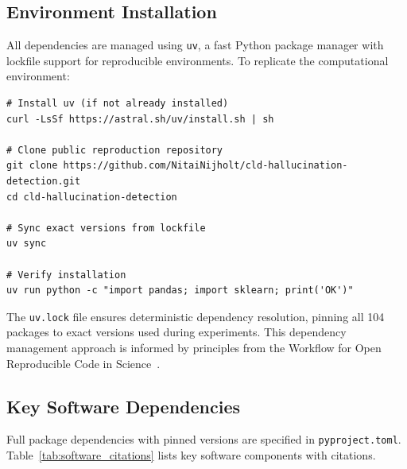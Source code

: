 \subsection{Environment Installation}

All dependencies are managed using \texttt{uv}, a fast Python package manager with lockfile support for reproducible environments. To replicate the computational environment:

\begin{verbatim}
# Install uv (if not already installed)
curl -LsSf https://astral.sh/uv/install.sh | sh

# Clone public reproduction repository
git clone https://github.com/NitaiNijholt/cld-hallucination-detection.git
cd cld-hallucination-detection

# Sync exact versions from lockfile
uv sync

# Verify installation
uv run python -c "import pandas; import sklearn; print('OK')"
\end{verbatim}

\noindent The \texttt{uv.lock} file ensures deterministic dependency resolution, pinning all 104 packages to exact versions used during experiments. This dependency management approach is informed by principles from the Workflow for Open Reproducible Code in Science~\cite{vanlissa2021worcs}.

\subsection{Key Software Dependencies}

Full package dependencies with pinned versions are specified in \texttt{pyproject.toml}. Table~\ref{tab:software_citations} lists key software components with citations.

